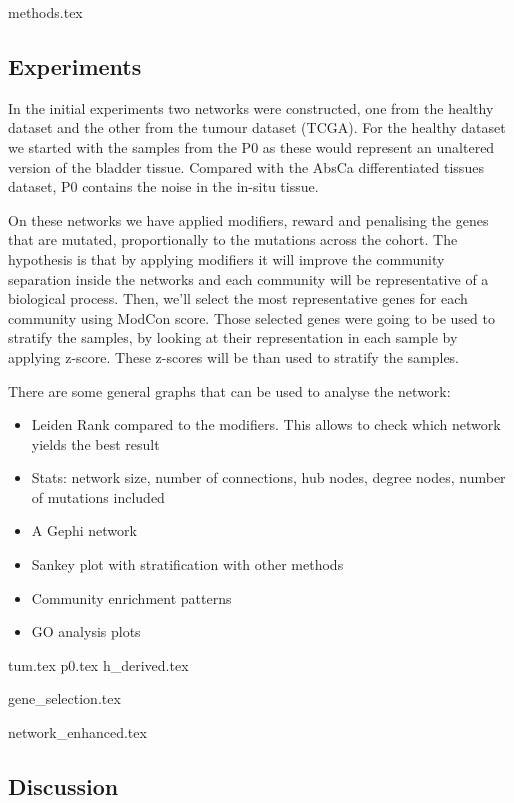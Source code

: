 {methods.tex}

\subsection{Experiments}


In the initial experiments two networks were constructed, one from the healthy dataset and the other from the tumour dataset (TCGA). For the healthy dataset we started with the samples from the P0 as these would represent an unaltered version of the bladder tissue. Compared with the AbsCa differentiated tissues dataset, P0 contains the noise in the in-situ tissue.

On these networks we have applied modifiers, reward and penalising the genes that are mutated, proportionally to the mutations across the cohort. The hypothesis is that by applying modifiers it will improve the community separation inside the networks and each community will be representative of a biological process. Then, we'll select the most representative genes for each community using ModCon score. Those selected genes were going to be used to stratify the samples, by looking at their representation in each sample by applying z-score. These z-scores will be than used to stratify the samples.


There are some general graphs that can be used to analyse the network:
\begin{itemize}
    \item Leiden Rank compared to the modifiers. This allows to check which network yields the best result
    \item Stats: network size, number of connections, hub nodes, degree nodes, number of mutations included
    \item A Gephi network
    \item Sankey plot with stratification with other methods
    \item Community enrichment patterns
    \item GO analysis plots
\end{itemize}


{tum.tex}
\newpage
{p0.tex}
\newpage
{h_derived.tex}
\newpage

{gene_selection.tex}
\newpage

{network_enhanced.tex}
\newpage

\subsection{Discussion}


